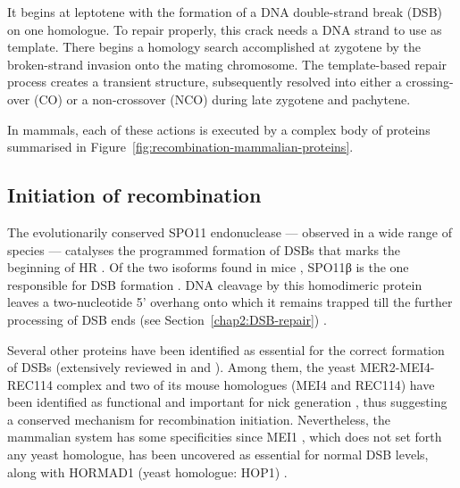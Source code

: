 It begins at leptotene with the formation of a DNA double-strand break (DSB) on one homologue. 
To repair properly, this crack needs a DNA strand to use as template. There begins a homology search accomplished at zygotene by the broken-strand invasion onto the mating chromosome.
The template-based repair process creates a transient structure, subsequently resolved into either a crossing-over (CO) or a non-crossover (NCO) during late zygotene and pachytene.

In mammals, each of these actions is executed by a complex body of proteins summarised in Figure~\ref{fig:recombination-mammalian-proteins}. 



\subsection{Initiation of recombination}

The evolutionarily conserved SPO11 endonuclease — observed in a wide range of species \citep{baudat2000chromosome,mckim1998meiw68,romanienko2000mouse,steiner2002meiotic,bowring2006chromosome,stacey2006arabidopsis} — catalyses the programmed formation of DSBs \citep{keeney1997meiosisspecific,bergerat1997atypical} that marks the beginning of HR \citep{sun1989double}.
Of the two isoforms found in mice \citep{metzler-guillemain2000identification}, SPO11\textgreek{β} is the one responsible for DSB formation \citep{bellani2010expression}.
DNA cleavage by this homodimeric protein leaves a two-nucleotide 5' overhang \citep{demassy1995nucleotidea}	onto which it remains trapped till the further processing of DSB ends (see Section~\ref{chap2:DSB-repair}) \citep[reviewed in][]{cole2010evolutionarya}.

Several other proteins have been identified as essential for the correct formation of DSBs (extensively reviewed in \citealp{keeney2008spo11a} and \citealp{demassy2013initiation}).
Among them, the yeast MER2-MEI4-REC114 complex \citep{li2006saccharomyces,maleki2007interactions} and two of its mouse homologues (MEI4 and REC114) have been identified as functional and important for nick generation \citep{kumar2010functional,kumar2015mei4}, thus suggesting a conserved mechanism for recombination initiation. 
Nevertheless, the mammalian system has some specificities since MEI1 \citep{libby2002mouse,libby2003positional}, which does not set forth any yeast homologue, has been uncovered as essential for normal DSB levels, along with HORMAD1 (yeast homologue: HOP1) \citep{shin2010hormad1,daniel2011meiotic}.

